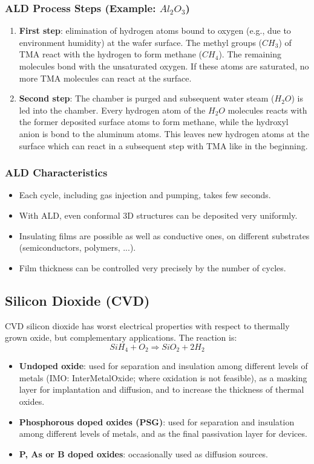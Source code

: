 \documentclass{report}
\begin{document}
\subsubsection{ALD Process Steps (Example: $Al_{2}O_{3}$)}
\begin{enumerate}
    \item \textbf{First step}: elimination of hydrogen atoms bound to oxygen (e.g., due to environment humidity) at the wafer surface. The methyl groups ($CH_{3}$) of TMA react with the hydrogen to form methane ($CH_{4}$). The remaining molecules bond with the unsaturated oxygen. If these atoms are saturated, no more TMA molecules can react at the surface.
    \item \textbf{Second step}: The chamber is purged and subsequent water steam ($H_{2}O$) is led into the chamber. Every hydrogen atom of the $H_{2}O$ molecules reacts with the former deposited surface atoms to form methane, while the hydroxyl anion is bond to the aluminum atoms. This leaves new hydrogen atoms at the surface which can react in a subsequent step with TMA like in the beginning.
\end{enumerate}

\subsubsection{ALD Characteristics}
\begin{itemize}
    \item Each cycle, including gas injection and pumping, takes few seconds.
    \item With ALD, even conformal 3D structures can be deposited very uniformly.
    \item Insulating films are possible as well as conductive ones, on different substrates (semiconductors, polymers, ...).
    \item Film thickness can be controlled very precisely by the number of cycles.
\end{itemize}

\subsection{Silicon Dioxide (CVD)}
CVD silicon dioxide has worst electrical properties with respect to thermally grown oxide, but complementary applications. The reaction is:
$$SiH_{4}+O_{2}\Rightarrow SiO_{2}+2H_{2}$$
\begin{itemize}
    \item \textbf{Undoped oxide}: used for separation and insulation among different levels of metals (IMO: InterMetalOxide; where oxidation is not feasible), as a masking layer for implantation and diffusion, and to increase the thickness of thermal oxides.
    \item \textbf{Phosphorous doped oxides (PSG)}: used for separation and insulation among different levels of metals, and as the final passivation layer for devices.
    \item \textbf{P, As or B doped oxides}: occasionally used as diffusion sources.
\end{itemize}
\end{document}
